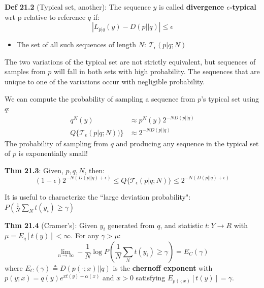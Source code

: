 \documentclass[12pt]{article} %
\begin{document}
\textbf{Def 21.2} (Typical set, another): The sequence $y$ is called \textbf{divergence $\epsilon$-typical} wrt p relative to reference $q$ if:
\begin{equation*}
    |L_{p|q}(y) - D(p||q)| \leq \epsilon
\end{equation*}
\begin{itemize}[topsep=-1pt, itemsep=-1pt]
    \item 
The set of all such sequences of length $N$: $\mathcal{T}_\epsilon(p|q;N)$
\end{itemize}
The two variations of the typical set are not strictly equivalent, but sequences of samples from $p$ will fall in both sets with high probability. The sequences that are unique to one of the variations occur with negligible probability.

We can compute the probability of sampling a sequence from $p$'s typical set using $q$:
\begin{align*}
    q^N(y) &\approx p^N(y) 2^{-ND(p||q)} \\
    Q\{\mathcal{T}_\epsilon(p|q;N))\}
    &\approx 2^{-ND(p||q)}
\end{align*}
The probability of sampling from $q$ and producing any sequence in the typical set of $p$ is exponentially small!

\textbf{Thm 21.3}: Given, $p,q,N$, then:
\begin{equation*}
    (1 - \epsilon)2^{-N(D(p||q) + \epsilon)}
    \leq
    Q\{\mathcal{T}_\epsilon(p|q;N)\}
    \leq
    2^{-N(D(p||q) + \epsilon)}
\end{equation*}

\separate

It is useful to characterize the ``large deviation probability": $P\left(\frac{1}{N} \sum_N t(y_i) \geq \gamma\right)$

\textbf{Thm 21.4} (Cramer's): Given $y_i$ generated from $q$, and statistic $t: Y \rightarrow R$ with $\mu = E_q[t(y)] < \infty$. For any $\gamma > \mu$:
\begin{equation*}
    \lim_{n \rightarrow \infty}
    -\frac{1}{N}
    \log P\left( 
    \frac{1}{N} \sum_N t(y_i) 
    \geq \gamma
    \right)
    = E_C(\gamma)
\end{equation*}
where $E_C(\gamma)\triangleq D(p(\cdot;x) || q)$ is the \textbf{chernoff exponent} with $p(y;x) = q(y) e^{xt(y) - \alpha(x)}$ and $x>0$ satisfying $E_{p(\cdot;x)}[t(y)] = \gamma$.

\newpage
{}
\end{document}
